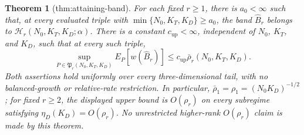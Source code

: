 \documentclass{article}
\newtheorem{theorem}{Theorem}
\begin{document}
\begin{theorem}[thm:attaining-band]\label{thm:attaining-band}
For each fixed \(r\ge1\), there is \(a_0<\infty\) such that, at every evaluated triple with \(\min\{N_0,K_T,K_D\}\ge a_0\), the band \(\widehat B_r\) belongs to \(\mathcal H_r(N_0,K_T,K_D;\alpha)\). There is a constant \(c_{\mathrm{up}}<\infty\), independent of \(N_0\), \(K_T\), and \(K_D\), such that at every such triple,
\[
 \sup_{P\in\mathfrak P_r(N_0,K_T,K_D)}E_P[w(\widehat B_r)]
 \le c_{\mathrm{up}}\bar\rho_r(N_0,K_T,K_D).
\]
Both assertions hold uniformly over every three-dimensional tail, with no balanced-growth or relative-rate restriction. In particular, \(\bar\rho_1=\rho_1=(N_0K_D)^{-1/2}\); for fixed \(r\ge2\), the displayed upper bound is \(O(\rho_r)\) on every subregime satisfying \(\eta_D(K_D)=O(\rho_r)\). No unrestricted higher-rank \(O(\rho_r)\) claim is made by this theorem.
\end{theorem}
\end{document}
